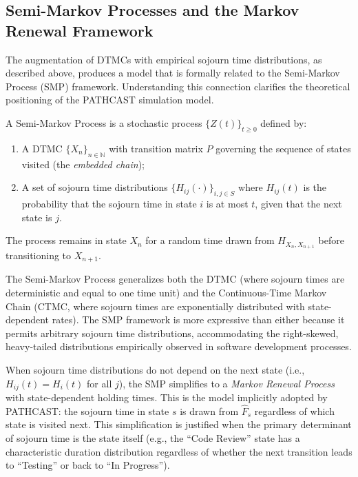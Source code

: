 \subsection{Semi-Markov Processes and the Markov Renewal Framework}
\label{sec:semi-markov}

The augmentation of DTMCs with empirical sojourn time distributions, as
described above, produces a model that is formally related to the
Semi-Markov Process (SMP) framework. Understanding this connection
clarifies the theoretical positioning of the PATHCAST simulation
model.

\begin{definition}
\label{def:semi-markov}
A Semi-Markov Process is a stochastic process $\{Z(t)\}_{t \geq 0}$
defined by:
\begin{enumerate}
    \item A DTMC $\{X_n\}_{n \in \mathbb{N}}$ with transition matrix $P$
    governing the sequence of states visited (the \emph{embedded chain});
    \item A set of sojourn time distributions
    $\{H_{ij}(\cdot)\}_{i,j \in S}$ where $H_{ij}(t)$ is the probability
    that the sojourn time in state $i$ is at most $t$, given that the
    next state is $j$.
\end{enumerate}
The process remains in state $X_n$ for a random time drawn from
$H_{X_n, X_{n+1}}$ before transitioning to $X_{n+1}$.
\end{definition}

The Semi-Markov Process generalizes both the DTMC (where sojourn times
are deterministic and equal to one time unit) and the Continuous-Time
Markov Chain (CTMC, where sojourn times are exponentially distributed
with state-dependent rates). The SMP framework is more expressive than
either because it permits arbitrary sojourn time distributions,
accommodating the right-skewed, heavy-tailed distributions empirically
observed in software development processes.

When sojourn time distributions do not depend on the next state
(i.e., $H_{ij}(t) = H_i(t)$ for all $j$), the SMP simplifies to a
\emph{Markov Renewal Process} with state-dependent holding times. This
is the model implicitly adopted by PATHCAST: the sojourn time in
state $s$ is drawn from $\hat{F}_s$ regardless of which state is visited
next. This simplification is justified when the primary determinant of
sojourn time is the state itself (e.g., the ``Code Review'' state has
a characteristic duration distribution regardless of whether the next
transition leads to ``Testing'' or back to ``In Progress'').


